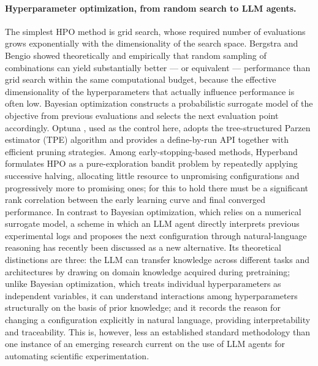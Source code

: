 \paragraph{Hyperparameter optimization, from random search to LLM agents.}
The simplest HPO method is grid search, whose required number of evaluations
grows exponentially with the dimensionality of the search space. Bergstra and
Bengio \citep{bergstra2012random} showed theoretically and empirically that
random sampling of combinations can yield substantially better --- or equivalent
--- performance than grid search within the same computational budget, because
the effective dimensionality of the hyperparameters that actually influence
performance is often low. Bayesian optimization constructs a probabilistic
surrogate model of the objective from previous evaluations and selects the next
evaluation point accordingly. Optuna \citep{akiba2019optuna}, used as the control
here, adopts the tree-structured Parzen estimator (TPE) algorithm and provides a
define-by-run API together with efficient pruning strategies. Among
early-stopping-based methods, Hyperband \citep{li2018hyperband} formulates HPO as
a pure-exploration bandit problem by repeatedly applying successive halving,
allocating little resource to unpromising configurations and progressively more
to promising ones; for this to hold there must be a significant rank correlation
between the early learning curve and final converged performance. In contrast to
Bayesian optimization, which relies on a numerical surrogate model, a scheme in
which an LLM agent directly interprets previous experimental logs and proposes
the next configuration through natural-language reasoning has recently been
discussed as a new alternative. Its theoretical distinctions are three: the LLM
can transfer knowledge across different tasks and architectures by drawing on
domain knowledge acquired during pretraining; unlike Bayesian optimization, which
treats individual hyperparameters as independent variables, it can understand
interactions among hyperparameters structurally on the basis of prior knowledge;
and it records the reason for changing a configuration explicitly in natural
language, providing interpretability and traceability. This is, however, less an
established standard methodology than one instance of an emerging research
current on the use of LLM agents for automating scientific experimentation.

